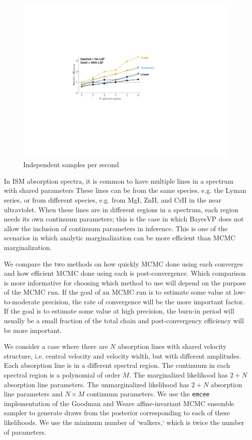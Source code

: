\documentclass[manuscript]{aastex62}
\begin{document}
\begin{figure}
  \includegraphics{efficiency.pdf}
  \caption{Independent samples per second}
  \label{fig:efficiency-comparison}
\end{figure}

In ISM absorption spectra, it is common to have multiple lines in a spectrum with shared parameters
These lines can be from the same species, e.g. the Lyman series, or from different species, e.g. from Mg\small{I}, Zn\small{II}, and Cr\small{II} in the near ultraviolet.
When these lines are in different regions in a spectrum, each region needs its own continuum parameters; this is the case in which BayesVP does not allow the inclusion of continuum parameters in inference.
This is one of the scenarios in which analytic marginalization can be more efficient than MCMC marginalization.

We compare the two methods on how quickly MCMC done using each converges and how efficient MCMC done using each is post-convergence.
Which comparison is more informative for choosing which method to use will depend on the purpose of the MCMC run.
If the goal of an MCMC run is to estimate some value at low-to-moderate precision, the rate of convergence will be the more important factor.
If the goal is to estimate some value at high precision, the burn-in period will usually be a small fraction of the total chain and post-convergency efficiency will be more important.

We consider a case where there are $N$ absorption lines with shared velocity structure, i.e. central velocity and velocity width, but with different amplitudes.
Each absorption line is in a different spectral region.
The continuum in each spectral region is a polynomial of order $M$.
The marginalized likelihood has $2 + N$ absorption line parameters.
The unmarginalized likelihood has $2 + N$ absorption line parameters and $N \times M$ continuum parameters.
We use the \texttt{emcee} implementation of the Goodman and Weare affine-invariant MCMC ensemble sampler to generate draws from the posterior corresponding to each of these likelihoods.
We use the minimum number of `walkers,` which is twice the number of parameters.
\end{document}
